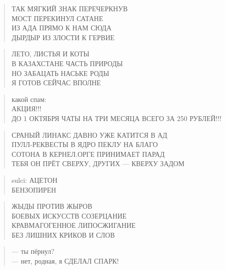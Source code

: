 \poemtitle{***}
\begin{verse}
ТАК МЯГКИЙ ЗНАК ПЕРЕЧЕРКНУВ\\
МОСТ ПЕРЕКИНУЛ САТАНЕ\\
ИЗ АДА ПРЯМО К НАМ СЮДА\\
ДЫРДЫР ИЗ ЗЛОСТИ К ГЕРВИЕ
\end{verse}

\poemtitle{***}
\begin{verse}
ЛЕТО, ЛИСТЬЯ И КОТЫ\\
В КАЗАХСТАНЕ ЧАСТЬ ПРИРОДЫ\\
НО ЗАБАЦАТЬ НАСЬКЕ РОДЫ\\
Я ГОТОВ СЕЙЧАС ВПОЛНЕ
\end{verse}

\poemtitle{***}
\begin{verse}
какой спам:\\
АКЦИЯ!!!\\
ДО 1 ОКТЯБРЯ  ЧАТЫ НА ТРИ МЕСЯЦА ВСЕГО ЗА 250 РУБЛЕЙ!!!
\end{verse}

\poemtitle{***}
\begin{verse}
СРАНЫЙ ЛИНАКС ДАВНО УЖЕ КАТИТСЯ В АД\\
ПУЛЛ-РЕКВЕСТЫ В ЯДРО ПЕКЛУ НА БЛАГО\\
СОТОНА В КЕРНЕЛ.ОРГЕ ПРИНИМАЕТ ПАРАД\\
ТЕБЯ ОН ПРЁТ СВЕРХУ, ДРУГИХ — КВЕРХУ ЗАДОМ
\end{verse}

\poemtitle{***}
\begin{verse}
sulci: АЦЕТОН\\
БЕНЗОПИРЕН
\end{verse}

\poemtitle{***}
\begin{verse}
ЖЫДЫ ПРОТИВ ЖЫРОВ\\
БОЕВЫХ ИСКУССТВ СОЗЕРЦАНИЕ\\
КРАВМАГОГЕННОЕ ЛИПОСЖИГАНИЕ\\
БЕЗ ЛИШНИХ КРИКОВ И СЛОВ
\end{verse}

\poemtitle{***}
\begin{verse}
— ты пёрнул?\\
— нет, родная, я СДЕЛАЛ СПАРК!
\end{verse}


